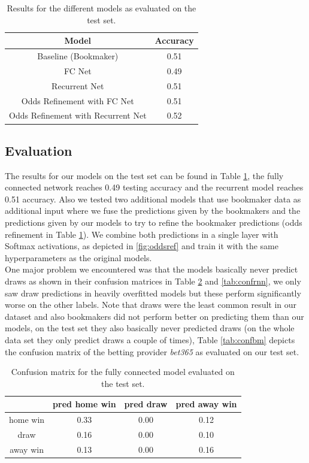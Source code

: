 \documentclass[a4paper]{article}
\begin{document}
\begin{table}
\begin{tabular}{|c|c|}
\hline 
\textbf{Model} & \textbf{Accuracy} \\ 
\hline 
\hline 
Baseline (Bookmaker) & 0.51 \\ 
\hline 
FC Net & 0.49 \\ 
\hline 
Recurrent Net & 0.51 \\ 
\hline 
Odds Refinement with FC Net & 0.51 \\ 
\hline 
Odds Refinement with Recurrent Net & 0.52 \\ 
\hline 
\end{tabular} 
\label{tab:accs}
\caption{Results for the different models as evaluated on the test set.}
\end{table}


\subsection{Evaluation}
The results for our models on the test set can be found in Table \ref{tab:accs},
the fully connected network reaches 0.49 testing accuracy and the recurrent
model reaches 0.51 accuracy. Also we tested two additional models that use
bookmaker data as additional input where we fuse the predictions given by the
bookmakers and the predictions given by our models to try to refine the
bookmaker predictions (odds refinement in Table \ref{tab:accs}). We combine both
predictions in a single layer with Softmax activations, as depicted in
\ref{fig:oddsref} and train it with the same hyperparameters as the original
models. \\
One major problem we encountered was that the models basically never predict
draws as shown in their confusion matrices in Table \ref{tab:conffc} and
\ref{tab:confrnn}, we only saw draw predictions in heavily overfitted models but
these perform significantly worse on the other labels. Note that draws were the
least common result in our dataset and also bookmakers did not perform better on
predicting them than our models, on the test set they also basically never
predicted draws (on the whole data set they only predict draws a couple of
times), Table \ref{tab:confbm} depicts the confusion matrix of the betting
provider \textit{bet365} as evaluated on our test set.

\begin{table}
\begin{tabular}{|c||c|c|c|}
\hline 
 & pred home win & pred draw  & pred away win \\ 
\hline 
\hline
home win & 0.33 & 0.00 & 0.12 \\ 
\hline 
draw & 0.16 & 0.00 & 0.10 \\ 
\hline 
away win & 0.13 & 0.00 & 0.16 \\ 
\hline 
\end{tabular} 
\caption{Confusion matrix for the fully connected model evaluated on the test set.}
\label{tab:conffc}
\end{table}
\end{document}
